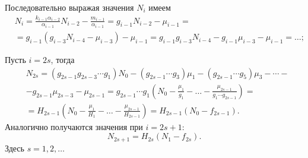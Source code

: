         Последовательно выражая значения \(N_{i}\) имеем
        \begin{equation*}
            \begin{split}
                & N_{i} = \frac{k_{i-1} \alpha_{i-2}}{\alpha_{i-1}} N_{i-2} - \frac{m_{i-1}}{\alpha_{i-1}} = g_{i-1} N_{i-2} - \mu_{i-1} =\\ 
                &= g_{i-1} \left( g_{i-3} N_{i-4} - \mu_{i-3} \right) - \mu_{i-1} = g_{i-1} g_{i-3} N_{i-4} - g_{i-1} \mu_{i-3} - \mu_{i-1} = \dots ;
            \end{split}
        \end{equation*}

        Пусть \(i = 2s\), тогда
        \begin{equation} \label{flow_2s}
            \begin{split}
            & N_{2s} = ( g_{2s-1} g_{2s-3} \cdots g_1 ) N_0 - ( g_{2s-1} \cdots g_3 ) \mu_1 - ( g_{2s-1} \cdots g_5 ) \mu_3 - \cdots - \\
            & - g_{2s-1} \mu_{2s-3} - \mu_{2s-1} = g_{2s-1} \cdots g_1 \left( N_0 - \frac{\mu_1}{g_1} - \dots - \frac{\mu_{2s-1}}{g_1 \cdots g_{2s-1}} \right) = \\
            & = H_{2s-1} \left( N_0 - \frac{\mu_1}{H_1} - \dots - \frac{\mu_{2s-1}}{H_{2s-1}} \right)
            = H_{2s-1} \left( N_0 - f_{2s-1} \right).
            \end{split}
        \end{equation}
        Аналогично получаются значения при \(i = 2s + 1\): 
        \begin{equation} \label{flow_2s1}
            N_{2s+1} = H_{2s} (N_1 - f_{2s}).
        \end{equation}
        Здесь \( s=1,2,\ldots \)

